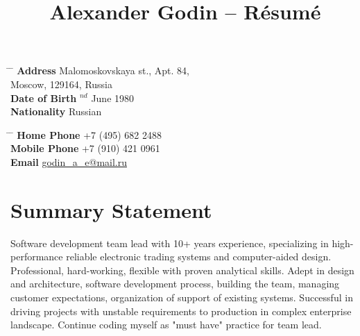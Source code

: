 \documentclass[10pt]{article} %
\begin{document}

\title{Alexander Godin -- Résumé} %


\parbox{0.5\textwidth}{ %
\begin{tabbing} %
\hspace{3cm} \= \hspace{4cm} \= \kill %
{\bf Address}  Malomoskovskaya st., Apt. 84, \\ %
\> Moscow, 129164, Russia \\ %
{\bf Date of Birth} $^{nd}$ June 1980 \\ %
{\bf Nationality} \> Russian %
\end{tabbing}}
\hfill %
\parbox{0.5\textwidth}{ %
\begin{tabbing} %
\hspace{3cm} \= \hspace{4cm} \= \kill %
{\bf Home Phone} \> +7 (495) 682 2488 \\ %
{\bf Mobile Phone} \> +7 (910) 421 0961 \\ %
{\bf Email} \> \href{mailto:godin\_a\_e@mail.ru}{godin\_a\_e@mail.ru} \\ %
\end{tabbing}}


\section{Summary Statement}

Software development team lead with 10+ years experience, specializing 
in high-performance reliable electronic trading systems and computer-aided design.
Professional, hard-working, flexible with proven analytical skills. Adept in design
and architecture, software development process, building the team, managing customer
expectations, organization of support of existing systems. Successful in driving projects
with unstable requirements to production in complex enterprise landscape. Continue coding 
myself as "must have" practice for team lead.
\end{document}
